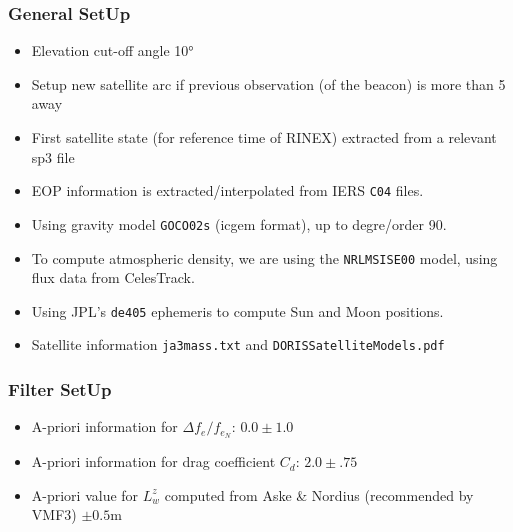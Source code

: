 \subsubsection{General SetUp}
\begin{itemize}
  \item Elevation cut-off angle \ang{10}
  \item Setup new satellite arc if previous observation (of the beacon) is more 
    than \SI{5}{\min} away
  \item First satellite state (for reference time of RINEX) extracted from a relevant 
    sp3 file
  \item EOP information is extracted/interpolated from IERS \texttt{C04} files.
  \item Using gravity model \texttt{GOCO02s} (icgem format), up to degre/order 90.
  \item To compute atmospheric density, we are using the \texttt{NRLMSISE00} model, 
    using flux data from CelesTrack.
  \item Using JPL's \texttt{de405} ephemeris to compute Sun and Moon positions.
  \item Satellite information \texttt{ja3mass.txt} and \texttt{DORISSatelliteModels.pdf} 
\end{itemize}

\subsubsection{Filter SetUp}
\begin{itemize}
  \item A-priori information for $\Delta f_e / f_{e_N}$: $0.0 \pm 1.0$
  \item A-priori information for drag coefficient $C_{d}$: $2.0 \pm .75$
  \item A-priori value for $L^z_w$ computed from Aske \& Nordius (recommended by VMF3) $\pm 0.5 \si{\m}$
\end{itemize}



